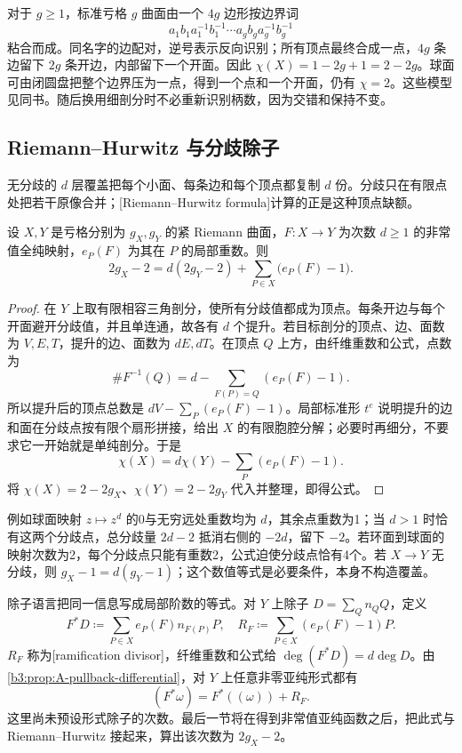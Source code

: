 \ProseParagraphBreak
对于 \(g\ge1\)，标准亏格 \(g\) 曲面由一个 \(4g\) 边形按边界词
\[
 a_1b_1a_1^{-1}b_1^{-1}\cdots a_gb_ga_g^{-1}b_g^{-1}
\]
粘合而成。同名字的边配对，逆号表示反向识别；所有顶点最终合成一点，\(4g\) 条边留下 \(2g\) 条开边，内部留下一个开面。因此 \(\chi(X)=1-2g+1=2-2g\)。球面可由闭圆盘把整个边界压为一点，得到一个点和一个开面，仍有 \(\chi=2\)。这些模型见同书\cite[pp. 5--6, 141]{Hatcher2002Algebraic}。随后换用细剖分时不必重新识别柄数，因为交错和保持不变。

\subsection{Riemann--Hurwitz 与分歧除子}
\label{b3:subsec:A0303}

无分歧的 \(d\) 层覆盖把每个小面、每条边和每个顶点都复制 \(d\) 份。分歧只在有限点处把若干原像合并；[Riemann--Hurwitz formula]计算的正是这种顶点缺额。

\begin{theorem}\label{b3:thm:A-riemann-hurwitz}
设 \(X,Y\) 是亏格分别为 \(g_X,g_Y\) 的紧 Riemann 曲面，\(F:X\rightarrow Y\) 为次数 \(d\ge1\) 的非常值全纯映射，\(e_P(F)\) 为其在 \(P\) 的局部重数。则
\[
 2g_X-2=d(2g_Y-2)+\sum_{P\in X}\bigl(e_P(F)-1\bigr).
\]
\end{theorem}
\begin{proof}
在 \(Y\) 上取有限相容三角剖分，使所有分歧值都成为顶点。每条开边与每个开面避开分歧值，并且单连通，故各有 \(d\) 个提升。若目标剖分的顶点、边、面数为 \(V,E,T\)，提升的边、面数为 \(dE,dT\)。在顶点 \(Q\) 上方，由纤维重数和公式，点数为
\[
 \#F^{-1}(Q)=d-\sum_{F(P)=Q}(e_P(F)-1).
\]
所以提升后的顶点总数是 \(dV-\sum_P(e_P(F)-1)\)。局部标准形 \(t^e\) 说明提升的边和面在分歧点按有限个扇形拼接，给出 \(X\) 的有限胞腔分解；必要时再细分，不要求它一开始就是单纯剖分。于是
\[
 \chi(X)=d\chi(Y)-\sum_P(e_P(F)-1).
\]
将 \(\chi(X)=2-2g_X\)、\(\chi(Y)=2-2g_Y\) 代入并整理，即得公式。
\end{proof}

例如球面映射 \(z\mapsto z^d\) 的0与无穷远处重数均为 \(d\)，其余点重数为1；当 \(d>1\) 时恰有这两个分歧点，总分歧量 \(2d-2\) 抵消右侧的 \(-2d\)，留下 \(-2\)。若环面到球面的映射次数为2，每个分歧点只能有重数2，公式迫使分歧点恰有4个。若 \(X\rightarrow Y\) 无分歧，则 \(g_X-1=d(g_Y-1)\)；这个数值等式是必要条件，本身不构造覆盖。

\ProseParagraphBreak
除子语言把同一信息写成局部阶数的等式。对 \(Y\) 上除子 \(D=\sum_Q n_Q Q\)，定义
\[
 F^*D\coloneqq\sum_{P\in X}e_P(F)n_{F(P)}P,
 \quad R_F\coloneqq\sum_{P\in X}(e_P(F)-1)P.
\]
\(R_F\) 称为[ramification divisor]，纤维重数和公式给 \(\deg(F^*D)=d\deg D\)。由\cref{b3:prop:A-pullback-differential}，对 \(Y\) 上任意非零亚纯形式都有
\[
 (F^*\omega)=F^*((\omega))+R_F.
\]
这里尚未预设形式除子的次数。最后一节将在得到非常值亚纯函数之后，把此式与 Riemann--Hurwitz 接起来，算出该次数为 \(2g_X-2\)。

